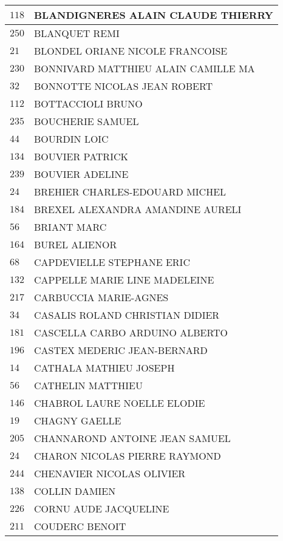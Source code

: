 \begin{xltabular}{\linewidth}{|l|X|}
    $118$ & BLANDIGNERES ALAIN CLAUDE THIERRY \\
    \hline
    $250$ & BLANQUET REMI \\
    \hline
    $21$ & BLONDEL ORIANE NICOLE FRANCOISE \\
    \hline
    $230$ & BONNIVARD MATTHIEU ALAIN CAMILLE MA \\
    \hline
    $32$ & BONNOTTE NICOLAS JEAN ROBERT \\
    \hline
    $112$ & BOTTACCIOLI BRUNO \\
    \hline
    $235$ & BOUCHERIE SAMUEL \\
    \hline
    $44$ & BOURDIN LOIC \\
    \hline
    $134$ & BOUVIER PATRICK \\
    \hline
    $239$ & BOUVIER ADELINE \\
    \hline
    $24$ & BREHIER CHARLES-EDOUARD MICHEL \\
    \hline
    $184$ & BREXEL ALEXANDRA AMANDINE AURELI \\
    \hline
    $56$ & BRIANT MARC \\
    \hline
    $164$ & BUREL ALIENOR \\
    \hline
    $68$ & CAPDEVIELLE STEPHANE ERIC \\
    \hline
    $132$ & CAPPELLE MARIE LINE MADELEINE \\
    \hline
    $217$ & CARBUCCIA MARIE-AGNES \\
    \hline
    $34$ & CASALIS ROLAND CHRISTIAN DIDIER \\
    \hline
    $181$ & CASCELLA CARBO ARDUINO ALBERTO \\
    \hline
    $196$ & CASTEX MEDERIC JEAN-BERNARD \\
    \hline
    $14$ & CATHALA MATHIEU JOSEPH \\
    \hline
    $56$ & CATHELIN MATTHIEU \\
    \hline
    $146$ & CHABROL LAURE NOELLE ELODIE \\
    \hline
    $19$ & CHAGNY GAELLE \\
    \hline
    $205$ & CHANNAROND ANTOINE JEAN SAMUEL \\
    \hline
    $24$ & CHARON NICOLAS PIERRE RAYMOND \\
    \hline
    $244$ & CHENAVIER NICOLAS OLIVIER \\
    \hline
    $138$ & COLLIN DAMIEN \\
    \hline
    $226$ & CORNU AUDE JACQUELINE \\
    \hline
    $211$ & COUDERC BENOIT \\

\end{xltabular}
